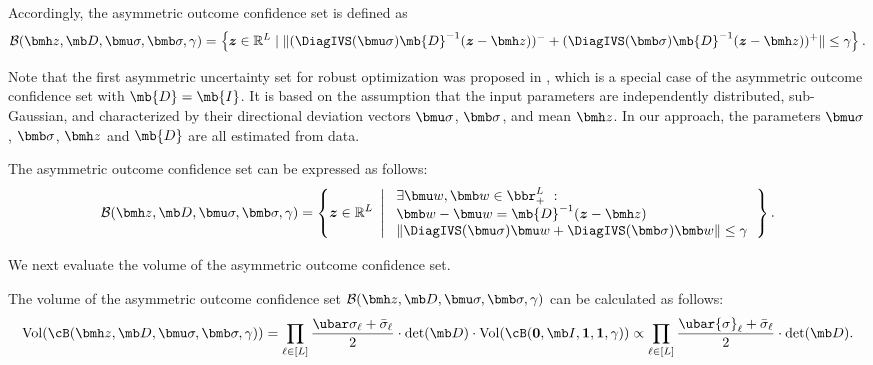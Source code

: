 \documentclass[opre, blindrev]{informs4}
\newcommand{\1}[1]{\mathds{1}{\left(#1\right)}}
\begin{document}
Accordingly, the asymmetric outcome confidence set is defined as
\begin{equation}
\label{eq:AsymmetricRegion}
\mathcal{B}(\bmh z, \mb D, \bmu \sigma, \bmb \sigma, \gamma) = \left\{ \bm z \in \mathbb{R}^L \;|\; \|(\DiagIVS(\bmu \sigma) \mb{D}^{-1} (\bm z-\bmh z))^- +  (\DiagIVS(\bmb \sigma) \mb{D}^{-1} (\bm z-\bmh z))^+\| \leq \gamma \right\}.
\end{equation}

Note that the first asymmetric uncertainty set for robust optimization was proposed in \cite{chen2007robust}, which is a special case of the asymmetric outcome confidence set with $\mb{D} = \mb{I}$. It is based on the assumption that the input parameters are independently distributed, sub-Gaussian, and characterized by their directional deviation vectors $\bmu \sigma$, $\bmb \sigma$, and mean $\bmh z$.  In our approach, the parameters $\bmu \sigma$, $\bmb \sigma$, $\bmh z$ and $\mb{D}$ are all estimated from data.

\begin{theorem}
\label{thm:AsymmetricRegion2}
The asymmetric outcome confidence set can be expressed as follows:
\begin{equation}
\label{eq:AsymmetricRegion2}
\mathcal{B}(\bmh z, \mb D, \bmu \sigma, \bmb \sigma, \gamma) = \left\{ \bm z \in \mathbb{R}^L ~\left|~ 
\begin{array}{l}
\exists \bmu w,\bmb w \in \bbr^L_+~:~ \\
\bmb w  -  \bmu w   =  \mb{D}^{-1} (\bm z - \bmh  z) \\
\|\DiagIVS(\bmu \sigma) \bmu w + \DiagIVS(\bmb \sigma) \bmb w\|\leq \gamma 
\end{array}
\right.
\right\}.
\end{equation}
\end{theorem}

We next evaluate the volume of the asymmetric outcome confidence set.
\begin{theorem}
\label{thm:asymmetricalvolume}
The volume of the asymmetric outcome confidence set $\mathcal{B}(\bmh z, \mb D, \bmu \sigma, \bmb \sigma, \gamma)$ can be calculated as follows:
$$
\mathrm{Vol}(\cB(\bmh z, \mb D, \bmu \sigma, \bmb \sigma , \gamma)) = \prod_{\ell \in [L]} \frac{\ubar \sigma_{\ell} + \bar \sigma_{\ell}}{2} \cdot \det(\mb D) \cdot \mathrm{Vol}(\cB(\bm 0, \mb I, \bm 1,\bm 1,\gamma)) \propto \displaystyle \prod_{\ell \in [L]} \frac{\ubar{\sigma}_{\ell} + \bar{\sigma}_{\ell}}{2} \cdot \det(\mb D).
$$
\end{theorem}
\end{document}
